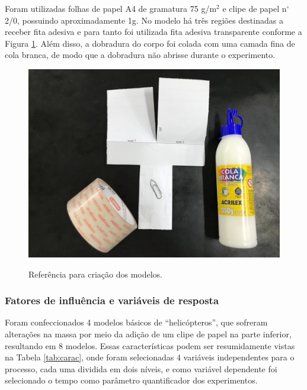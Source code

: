 Foram utilizadas folhas de papel A4 de gramatura 75 g/m$^2$ e clipe de papel n$^\circ$ 2/0, possuindo aproximadamente 1g. No modelo há três regiões destinadas a receber fita adesiva e para tanto foi utilizada fita adesiva transparente conforme a Figura \ref{fig:helimodel}. Além disso, a dobradura do corpo foi colada com uma camada fina de cola branca, de modo que a dobradura não abrisse durante o experimento.

\begin{figure}[h]
  \centering
  \caption{Referência para criação dos modelos.}
  \includegraphics[scale=0.2]{images/helimodel.jpg}
  \label{fig:helimodel}
\end{figure}

\subsubsection*{Fatores de influência e variáveis de resposta}

Foram confeccionados 4 modelos básicos de ``helicópteros'', que sofreram alterações na massa por meio da adição de um clipe de papel na parte inferior, resultando em 8 modelos. Essas características podem ser resumidamente vistas na Tabela \ref{tab:carac}, onde foram selecionadas 4 variáveis independentes para o processo, cada uma dividida em dois níveis, e como variável dependente foi selecionado o tempo como parâmetro quantificador dos experimentos.

